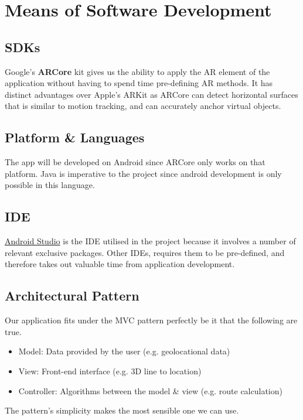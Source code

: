 
\section{Means of Software Development}

\subsection*{SDKs}
Google's \textbf{ARCore} kit gives us the ability to apply the AR element of the application without having to spend time pre-defining AR methods. It has distinct advantages over Apple's ARKit as ARCore can detect horizontal surfaces that is similar to motion tracking, and can accurately anchor virtual objects. \cite{newgenapps}

\subsection*{Platform \& Languages}
The app will be developed on Android since ARCore only works on that platform. Java is imperative to the project since android development is only possible in this language.

\subsection*{IDE}
\underline{Android Studio} is the IDE utilised in the project because it involves a number of relevant exclusive packages. Other IDEs, requires them to be pre-defined, and therefore takes out valuable time from application development.

\subsection*{Architectural Pattern}
Our application fits under the MVC pattern perfectly be it that the following are true.
\begin{itemize}
    \item Model: Data provided by the user (e.g. geolocational data)
    \item View: Front-end interface (e.g. 3D line to location)
    \item Controller: Algorithms between the model \& view (e.g. route calculation)
\end{itemize}
The pattern's simplicity makes the most sensible one we can use.

